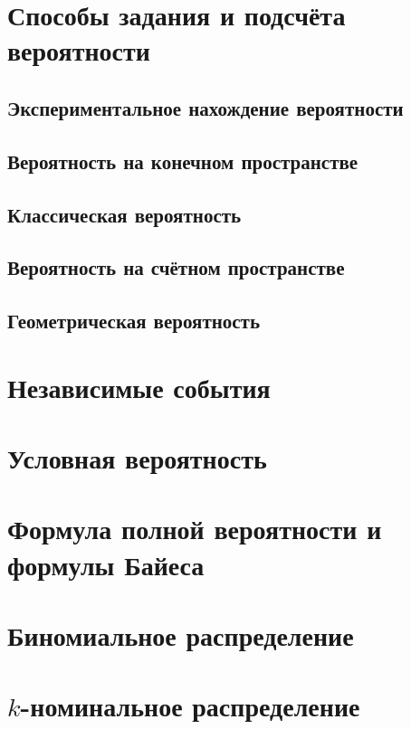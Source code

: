 \section{Способы задания и подсчёта вероятности}

\subsection{Экспериментальное нахождение вероятности}


\subsection{Вероятность на конечном пространстве}

\subsection{Классическая вероятность}

\subsection{Вероятность на счётном пространстве}

\subsection{Геометрическая вероятность}

\section{Независимые события}

\section{Условная вероятность}

\section{Формула полной вероятности и формулы Байеса}

\section{Биномиальное распределение}

\section{$k$-номинальное распределение}

